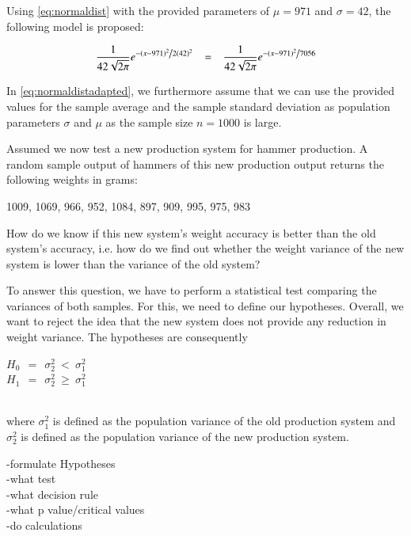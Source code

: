 Using \ref{eq:normaldist} with the provided parameters of $\mu = 971$ and $\sigma = 42$, the following model is proposed: 

\begin{equation} \frac{1}{{42 \sqrt {2\pi } }}e^{{{ - \left( {x - 971 } \right)^2 } \mathord{\left/ {\vphantom {{ - \left( {x - 971 } \right)^2 } {2(42) ^2 }}} \right. \kern-\nulldelimiterspace}{2(42) ^2 }}} ~~~=~~~ \frac{1}{{42 \sqrt {2\pi } }}e^{{{ - \left( {x - 971 } \right)^2 } \mathord{\left/ {\vphantom {{ - \left( {x - 971 } \right)^2 } {7056 }}} \right. \kern-\nulldelimiterspace}{7056 }}}
\label{eq:normaldistadapted}
\end{equation}

In \ref{eq:normaldistadapted}, we furthermore assume that we can use the provided values for the sample average and the sample standard deviation as population parameters $\sigma$ and $\mu$ as the sample size $n = 1000$ is large. 

Assumed we now test a new production system for hammer production. A random sample output of hammers of this new production output returns the following weights in grams: \\

\begin{center}
    1009, 1069, 966, 952, 1084, 897, 909, 995, 975, 983
\end{center}

How do we know if this new system's weight accuracy is better than the old system's accuracy, i.e. how do we find out whether the weight variance of the new system is lower than the variance of the old system?

To answer this question, we have to perform a statistical test comparing the variances of both samples. For this, we need to define our hypotheses. Overall, we want to reject the idea that the new system does not provide any reduction in weight variance. The hypotheses are consequently 
\\
\begin{center}
$H_0~~=~~ \sigma^2_2~<~\sigma^2_1$\\
$H_1~~=~~ \sigma^2_2~\geq~\sigma^2_1$
\end{center}
\\
where $\sigma^2_1$ is defined as the population variance of the old production system and $\sigma^2_2$ is defined as the population variance of the new production system.




-formulate Hypotheses\\
-what test\\
-what decision rule\\
-what p value/critical values\\
-do calculations




